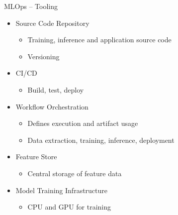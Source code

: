 \documentclass[ignorenonframetext,xcolor=x11names]{beamer}
\begin{document}
\begin{frame}[label=full]{MLOps -- Tooling}
\begin{itemize}
  \item Source Code Repository
  \begin{itemize}
  \footnotesize
     \item Training, inference and application source code
     \item Versioning
  \end{itemize}
  \item CI/CD
  \begin{itemize}
  \footnotesize
     \item Build, test, deploy
  \end{itemize}
  \item Workflow Orchestration
  \begin{itemize}
  \footnotesize
     \item Defines execution and artifact usage
     \item Data extraction, training, inference, deployment
  \end{itemize}
  \item Feature Store
  \begin{itemize}
  \footnotesize
     \item Central storage of feature data
  \end{itemize}
  \item Model Training Infrastructure
  \begin{itemize}
  \footnotesize
     \item CPU and GPU for training
  \end{itemize}
\end{itemize}
\end{frame}
\end{document}
